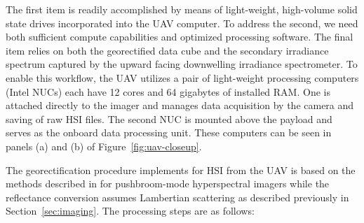 The first item is readily accomplished by means of light-weight, high-volume
solid state drives incorporated into the UAV computer. To address the second, we
need both sufficient compute capabilities and optimized processing software. The
final item relies on both the georectified data cube and the secondary
irradiance spectrum captured by the upward facing downwelling irradiance
spectrometer. To enable this workflow, the UAV utilizes a pair of light-weight
processing computers (Intel NUCs) each have 12 cores and 64 gigabytes of
installed RAM.  One is attached directly to the imager and
manages data acquisition by the camera and saving of raw HSI files. The second
NUC is mounted above the payload and serves as the onboard data processing unit. These
computers can be seen in panels (a) and (b) of Figure~\ref{fig:uav-closeup}.


The georectification procedure implements for HSI from the UAV is based on the
methods described in \cite{muller2002program, baumker2001new, mostafa2000multi}
for pushbroom-mode hyperspectral imagers while the reflectance conversion
assumes Lambertian scattering as described previously in Section~\ref{sec:imaging}.
The processing steps are as follows:

